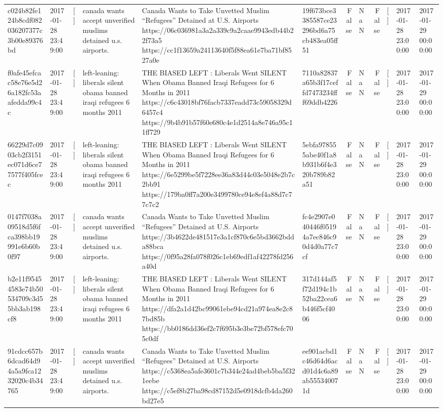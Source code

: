 \begin{tabular}{llllllrlrlll}
c024b82fe124b8cdf082036207377c3b00e89376bd & 2017-01-28 23:49:00 & [] & canada wants accept unverified muslims detained u.s. airports. & Canada Wants to Take Unvetted Muslim “Refugees” Detained at U.S. Airports https://06c036981a3a2a339c9a2caae9943edb44b22f73a5 https://cc1f13659a24113640f5f88ea61e7ba71bf8527a0e & 19f673bce3385587ce23296bd6a75cb483ea05ff51 & False & NaN & False & [] & 2017-01-28 23:00:00 & 2017-01-29 00:00:00 \\
f0afe45efcac58e76e5d26a182fc53aafedda99c4c & 2017-01-28 23:49:00 & [] & left-leaning: liberals silent obama banned iraqi refugees 6 months 2011 & THE BIASED LEFT : Liberals Went SILENT When Obama Banned Iraqi Refugees for 6 Months in 2011 https://c6c43018bf76facb7337eadd73c59058329d6457c4 https://9b4b91b57f60e680c4e1d2514a8e746a95c11ff729 & 7110a82837a65b3f17ceffd7473234fff69ddb4226 & False & NaN & False & [] & 2017-01-28 23:00:00 & 2017-01-29 00:00:00 \\
66229d7c0903cb2f3151ec071d6ce77577f405fcec & 2017-01-28 23:49:00 & [] & left-leaning: liberals silent obama banned iraqi refugees 6 months 2011 & THE BIASED LEFT : Liberals Went SILENT When Obama Banned Iraqi Refugees for 6 Months in 2011 https://6e5299be5f7228ee36a83d44c03e5048e2b7c2bb91 https://179ba0ff7a200e3499780ce94e8ef4a88d7c77c7c2 & 5ebfa978555abe40f1a8b931b6f4e320b789b82a51 & False & NaN & False & [] & 2017-01-28 23:00:00 & 2017-01-29 00:00:00 \\
0147f7038a09518d5f6fca398bb19991e6b60b0f97 & 2017-01-28 23:49:00 & [] & canada wants accept unverified muslims detained u.s. airports. & Canada Wants to Take Unvetted Muslim “Refugees” Detained at U.S. Airports https://3b4622de481517e3a1cf870c6e5bd3662bdda88bca https://0f95a28fa078f026c1eb69edf1af42278fd256a40d & fc4e2907e040446f05194a7ec846c90d4d0a77c7cf & False & NaN & False & [] & 2017-01-28 23:00:00 & 2017-01-29 00:00:00 \\
b2e11f95454583e74b50534709c3d55bb3ab198cf8 & 2017-01-28 23:49:00 & [] & left-leaning: liberals silent obama banned iraqi refugees 6 months 2011 & THE BIASED LEFT : Liberals Went SILENT When Obama Banned Iraqi Refugees for 6 Months in 2011 https://dfa2a1d42bc99061ebe94cd21a974ea8e2c87bd85b https://bb0186dd36ef2c7f695b3e3be72bf578efc705c0df & 317d144af5f72d194c1b52ba22cea6b446f5cf4006 & False & NaN & False & [] & 2017-01-28 23:00:00 & 2017-01-29 00:00:00 \\
91cdcc657b6dcad64d94a5a9fca1232020c4b34765 & 2017-01-28 23:49:00 & [] & canada wants accept unverified muslims detained u.s. airports. & Canada Wants to Take Unvetted Muslim “Refugees” Detained at U.S. Airports https://c5368ea5afe3601c7b344e24ad4beb5ba5f321eebe https://c5ef8b27ba98cd87152d5e0918dcfb4da260bd27e5 & ee901acbd1c46d64d6acd01d4c6a89ab555340071d & False & NaN & False & [] & 2017-01-28 23:00:00 & 2017-01-29 00:00:00 \\

\end{tabular}
